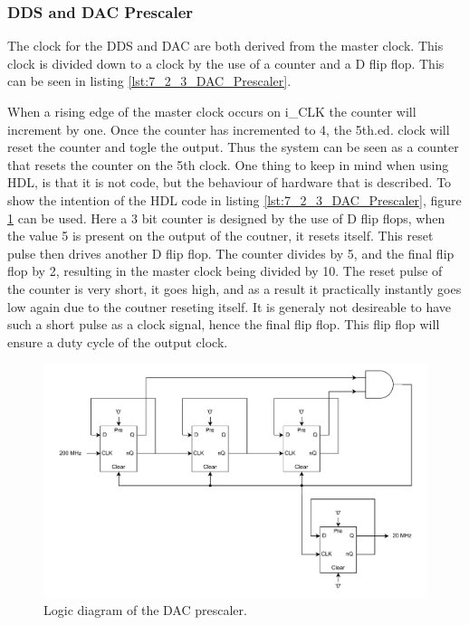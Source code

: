 \subsubsection{DDS and DAC Prescaler}
The clock for the DDS and DAC are both derived from the  master clock. This clock is divided down to a  clock by the use of a counter and a D flip flop. This can be seen in listing \ref{lst:7_2_3_DAC_Prescaler}. 



When a rising edge of the master clock occurs on i\_CLK the counter will increment by one. Once the counter has incremented to 4, the 5th.ed. clock will reset the counter and togle the output. Thus the system can be seen as a counter that resets the counter on the 5th clock. One thing to keep in mind when using HDL, is that it is not code, but the behaviour of hardware that is described. To show the intention of the HDL code in listing \ref{lst:7_2_3_DAC_Prescaler}, figure \ref{fig:7_2_3_DAC_PRESCALER_LOGIC} can be used. Here a 3 bit counter is designed by the use of D flip flops, when the value 5 is present on the output of the coutner, it resets itself. This reset pulse then drives another D flip flop. The counter divides by 5, and the final flip flop by 2, resulting in the master clock being divided by 10. The reset pulse of the counter is very short, it goes high, and as a result it practically instantly goes low again due to the coutner reseting itself. It is generaly not desireable to have such a short pulse as a clock signal, hence the final flip flop. This flip flop will ensure a  duty cycle of the output clock.

\begin{figure}[H]
    \centering
    \includegraphics[clip, trim=0 0 0 0, width=1\textwidth]{Sections/7_SystemDesign/Figures/DAC_PRESCALER_LOGIC.pdf}
    \caption{Logic diagram of the DAC prescaler.}
    \label{fig:7_2_3_DAC_PRESCALER_LOGIC}
\end{figure}


